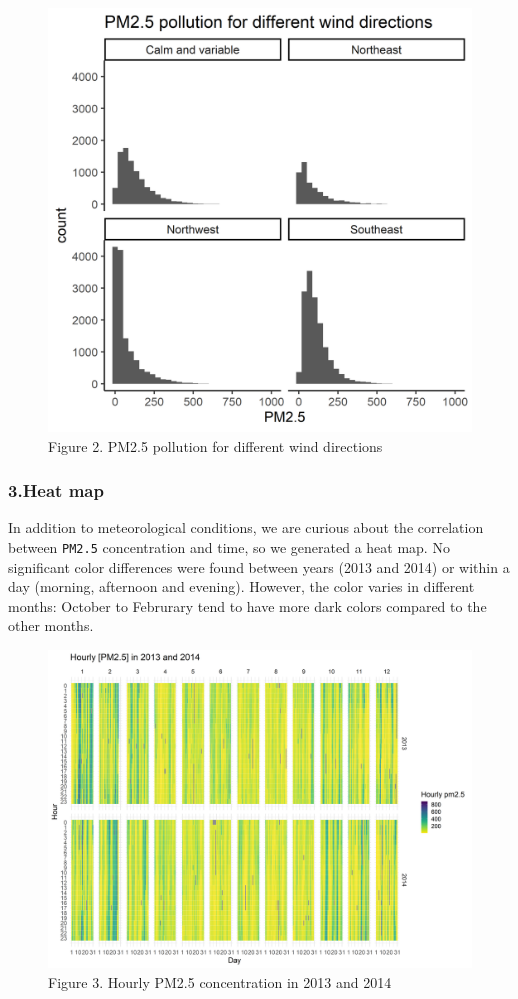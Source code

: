\documentclass[]{article}
\begin{document}
\begin{figure}
\centering
\includegraphics{../images/facted_hist.png}
\caption{Figure 2. PM2.5 pollution for different wind directions}
\end{figure}

\hypertarget{heat-map}{%
\subsubsection{3.Heat map}\label{heat-map}}

In addition to meteorological conditions, we are curious about the
correlation between \texttt{PM2.5} concentration and time, so we
generated a heat map. No significant color differences were found
between years (2013 and 2014) or within a day (morning, afternoon and
evening). However, the color varies in different months: October to
Februrary tend to have more dark colors compared to the other months.

\begin{figure}
\centering
\includegraphics{../images/heatmap.png}
\caption{Figure 3. Hourly PM2.5 concentration in 2013 and 2014}
\end{figure}
\end{document}
